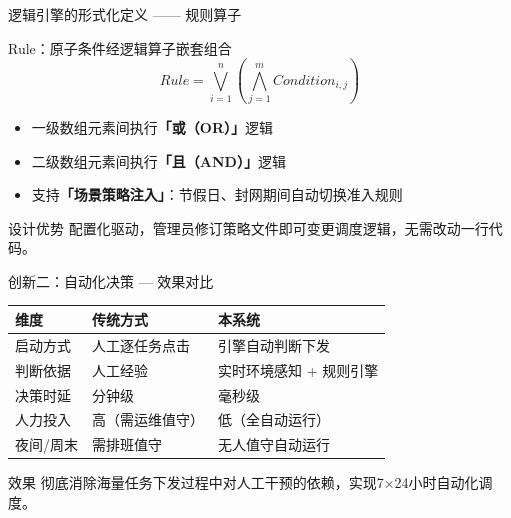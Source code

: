 \documentclass[aspectratio=169,UTF8,xcolor=table]{ctexbeamer}
\begin{document}
\begin{frame}{逻辑引擎的形式化定义 —— 规则算子}
  \begin{block}{Rule：原子条件经逻辑算子嵌套组合}
    \[
    Rule = \bigvee_{i=1}^{n} \left( \bigwedge_{j=1}^{m} Condition_{i,j} \right)
    \]
  \end{block}

  \vspace{0.3cm}
  \begin{itemize}
    \item 一级数组元素间执行\textbf{「或（OR）」}逻辑
    \item 二级数组元素间执行\textbf{「且（AND）」}逻辑
    \item 支持\textbf{「场景策略注入」}：节假日、封网期间自动切换准入规则
  \end{itemize}

  \vspace{0.4cm}
  \begin{exampleblock}{设计优势}
    配置化驱动，管理员修订策略文件即可变更调度逻辑，无需改动一行代码。
  \end{exampleblock}
\end{frame}

\begin{frame}{创新二：自动化决策 — 效果对比}
  \begin{center}
    \begin{tabular}{|p{3cm}|p{4.2cm}|p{4.2cm}|}
      \hline
      \textbf{维度} & \textbf{传统方式} & \textbf{本系统} \\
      \hline
      启动方式 & 人工逐任务点击 & 引擎自动判断下发 \\
      \hline
      判断依据 & 人工经验 & 实时环境感知 + 规则引擎 \\
      \hline
      决策时延 & 分钟级 & 毫秒级 \\
      \hline
      人力投入 & 高（需运维值守） & 低（全自动运行） \\
      \hline
      夜间/周末 & 需排班值守 & 无人值守自动运行 \\
      \hline
    \end{tabular}
  \end{center}

  \vspace{0.3cm}
  \begin{exampleblock}{效果}
    彻底消除海量任务下发过程中对人工干预的依赖，实现7×24小时自动化调度。
  \end{exampleblock}
\end{frame}
\end{document}
